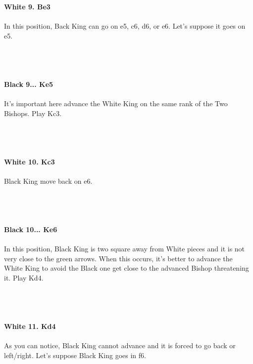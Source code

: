 \documentclass{article}
\begin{document}

\\
\\
\textbf{White 9. Be3}\\
\\
In this position, Back King can go on e5, c6, d6, or e6. Let's suppose it goes on e5.\\\\
\\

\\
\\
\textbf{Black 9... Ke5}\\
\\
It's important here advance the White King on the same rank of the Two Bishops. Play Kc3.\\\\
\\

\\
\\
\textbf{White 10. Kc3}\\
\\
Black King move back on e6.\\\\
\\

\\
\\
\textbf{Black 10... Ke6}\\
\\
In this position, Black King is two square away from White pieces and it is not very close to the green arrows. When this occurs, it's better to advance the White King to avoid the Black one get close to the advanced Bishop threatening it. Play Kd4.\\\\
\\

\\
\\
\textbf{White 11. Kd4}\\
\\
As you can notice, Black King cannot advance and it is forced to go back or left/right. Let's suppose Black King goes in f6.\\\\
\\
\end{document}
